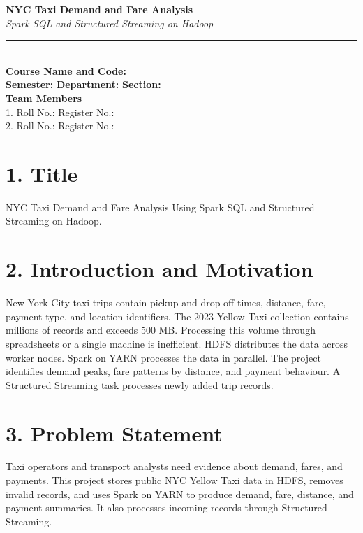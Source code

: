 \documentclass[12pt,a4paper]{article}
\begin{document}
\begin{center}
{\LARGE \textbf{NYC Taxi Demand and Fare Analysis}}\\[3pt]
{\large \textit{Spark SQL and Structured Streaming on Hadoop}}\\[14pt]
\rule{\textwidth}{0.5pt}\\[8pt]
\textbf{Course Name and Code:} \underline{\hspace{8cm}}\\[3pt]
\textbf{Semester:} \underline{\hspace{2.5cm}} \quad \textbf{Department:} \underline{\hspace{3.5cm}} \quad \textbf{Section:} \underline{\hspace{1.5cm}}\\[10pt]
\textbf{Team Members}\\[3pt]
1. \underline{\hspace{5cm}} \quad Roll No.: \underline{\hspace{3cm}} \quad Register No.: \underline{\hspace{3cm}}\\
2. \underline{\hspace{5cm}} \quad Roll No.: \underline{\hspace{3cm}} \quad Register No.: \underline{\hspace{3cm}}
\end{center}
\section*{1. Title}
NYC Taxi Demand and Fare Analysis Using Spark SQL and Structured Streaming on Hadoop.
\section*{2. Introduction and Motivation}
New York City taxi trips contain pickup and drop-off times, distance, fare, payment type, and location identifiers. The 2023 Yellow Taxi collection contains millions of records and exceeds 500 MB. Processing this volume through spreadsheets or a single machine is inefficient. HDFS distributes the data across worker nodes. Spark on YARN processes the data in parallel. The project identifies demand peaks, fare patterns by distance, and payment behaviour. A Structured Streaming task processes newly added trip records.
\section*{3. Problem Statement}
Taxi operators and transport analysts need evidence about demand, fares, and payments. This project stores public NYC Yellow Taxi data in HDFS, removes invalid records, and uses Spark on YARN to produce demand, fare, distance, and payment summaries. It also processes incoming records through Structured Streaming.
\end{document}

